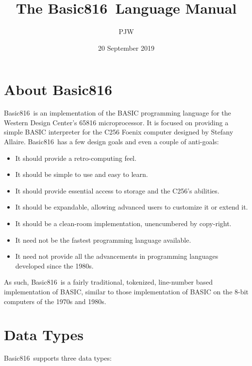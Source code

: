 \documentclass{article}
\begin{document}
    \newcommand{\BASIC}[0]{{\sc Basic816}}
    \newcommand{\keyword}[1]{{\tt {#1}}}
    \newcommand{\param}[1]{{\tt <{#1}>}}
    \title{The \BASIC\  Language Manual}
    \author{PJW}
    \date{20 September 2019}
    \maketitle

    \section{About \BASIC}

    \BASIC\ is an implementation of the BASIC programming language for the Western Design Center's 65816 microprocessor.
    It is focused on providing a simple BASIC interpreter for the C256 Foenix computer designed by Stefany Allaire.
    \BASIC\ has a few design goals and even a couple of anti-goals:

    \begin{itemize}
        \item It should provide a retro-computing feel.
        \item It should be simple to use and easy to learn.
        \item It should provide essential access to storage and the C256's abilities.
        \item It should be expandable, allowing advanced users to customize it or extend it.
        \item It should be a clean-room implementation, unencumbered by copy-right. 
        \item It need not be the fastest programming language available.
        \item It need not provide all the advancements in programming languages developed since the 1980s.
    \end{itemize}

    As such, \BASIC\ is a fairly traditional, tokenized, line-number based implementation of BASIC, similar to those
    implementation of BASIC on the 8-bit computers of the 1970s and 1980s.

    \section{Data Types}

    \BASIC\ supports three data types:
\end{document}
